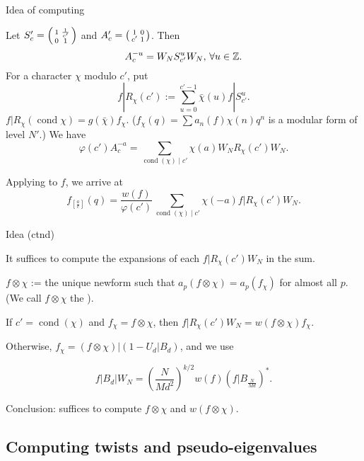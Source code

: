 \documentclass[handout]{beamer}
\DeclareMathOperator{\cond}{cond}
\begin{document}
\begin{frame}{Idea of computing}

Let $S_c' = \left( \begin{smallmatrix}1&\frac{1}{c'}\\0&1\end{smallmatrix}\right)$ and $A_c' = \left( \begin{smallmatrix}1&0\\c'&1\end{smallmatrix}\right)$.  Then 
\[
	A_c^{-u} = W_N S_{c'}^u W_N, \, \forall u \in \mathbb{Z}. 
\]
For a character $\chi$ modulo $c'$, put 
\begin{equation*}
\label{formula: RS}
	f | R_\chi(c') := \sum_{u =0}^{c'-1} \bar{\chi}(u) f | S_{c'}^u.
\end{equation*}
$f|R_\chi(\cond \chi) = g(\bar{\chi})f_\chi$. ($f_\chi (q) = \sum a_n(f) \chi(n)  q^n$ is a modular form of level $N'$.)   We have \begin{equation} 
\label{formula}
	\varphi(c') A_c^{-a} = \sum_{\cond(\chi) \mid c'} \chi(a) W_N R_\chi(c') W_N. 
\end{equation}

Applying to $f$, we arrive at
\begin{equation} \label{expansion0}
	\boxed{f_{[\frac{a}{c}]} \left( q\right) = \frac{w(f) }{\varphi(c')}\sum_{\cond(\chi) \mid c'} \chi(-a) f| R_\chi(c')  W_N}. 
\end{equation}
\end{frame}


\begin{frame}{Idea (ctnd)}

It suffices to compute the expansions of  each $f| R_\chi(c') W_N$ in the sum. 

$f \otimes \chi$ :=  the unique newform such that $a_p(f \otimes \chi) = a_p(f_\chi)$ for almost all $p$. 
(We call $f \otimes \chi$ the ).


If $c' = \cond(\chi)$ and $f_\chi = f \otimes \chi$, then  $f| R_\chi(c') W_N = w(f \otimes \chi) f_\chi$. 
\medskip

Otherwise, $f_\chi = (f \otimes \chi) | ( 1 - U_d | B_d)$, and we use 
\begin{Lemma}
   $$f| B_d|W_N = \left(\frac{N}{Md^2} \right)^{k/2}  w(f)  (f|B_{\frac{N}{Md}})^{*}.$$
\end{Lemma} 

\medskip

Conclusion: suffices to compute $f \otimes \chi$ and $w(f \otimes \chi)$.

\end{frame}

\subsection{Computing twists and pseudo-eigenvalues}
\end{document}
